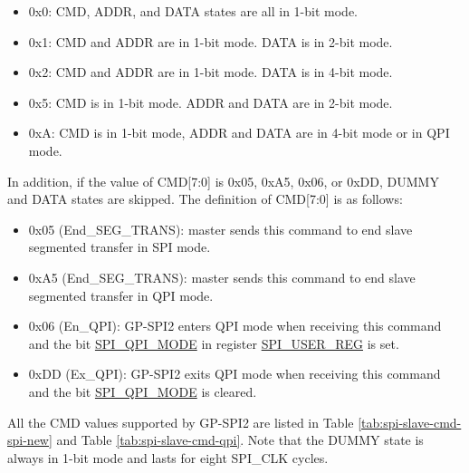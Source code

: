 \documentclass[main\_\_EN.tex]{subfiles}
\begin{document}
\begin{itemize}
    \item 0x0: CMD, ADDR, and DATA states are all in 1-bit mode.
    \item 0x1: CMD and ADDR are in 1-bit mode. DATA is in 2-bit mode.
    \item 0x2: CMD and ADDR are in 1-bit mode. DATA is in 4-bit mode.
    \item 0x5: CMD is in 1-bit mode. ADDR and DATA are in 2-bit mode.
    \item 0xA: CMD is in 1-bit mode, ADDR and DATA are in 4-bit mode or in QPI mode.
\end{itemize}

In addition, if the value of CMD[7:0] is 0x05, 0xA5, 0x06, or 0xDD, DUMMY and DATA states are skipped. The definition of CMD[7:0] is as follows:

\begin{itemize}
    \item \label{cmd:ENDSEGTRANS} 0x05 (End\_SEG\_TRANS): master sends this command to end slave segmented transfer in SPI mode.
    \item 0xA5 (End\_SEG\_TRANS): master sends this command to end slave segmented transfer in QPI mode. 
    \item 0x06 (En\_QPI): GP-SPI2 enters QPI mode when receiving this command and the bit \hyperref[fielddesc:SPIQPIMODE]{SPI\_QPI\_MODE} in register \hyperref[regdesc:SPIUSERREG]{SPI\_USER\_REG} is set.
    \item 0xDD (Ex\_QPI): GP-SPI2 exits QPI mode when receiving this command and the bit \hyperref[fielddesc:SPIQPIMODE]{SPI\_QPI\_MODE} is cleared.
\end{itemize}

All the CMD values supported by GP-SPI2 are listed in Table \ref{tab:spi-slave-cmd-spi-new} and Table \ref{tab:spi-slave-cmd-qpi}. Note that the DUMMY state is always in 1-bit mode and lasts for eight SPI\_CLK cycles.
\end{document}
